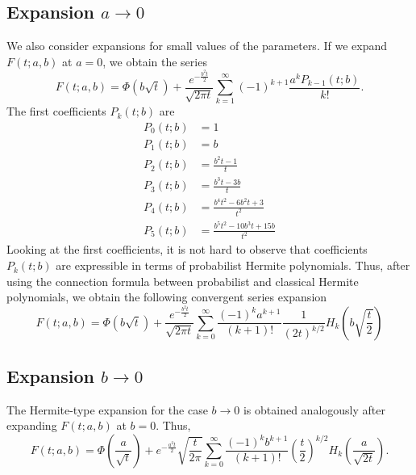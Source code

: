 \documentclass[10pt,a4paper,oneside]{article}
\numberwithin{equation}{section}
\begin{document}
\begin{appendices}
\subsection{Expansion $a \to 0$}
We also consider expansions for small values of the parameters. If we expand $F(t; a, b)$ at $a = 0$, we obtain the series
\begin{equation}
F(t; a, b) = \Phi\left(b\sqrt{t}\right) + \frac{e^{-\frac{b^2 t}{2}}}{\sqrt{2\pi t}}\sum_{k=1}^{\infty} (-1)^{k+1} \frac{a^k P_{k-1}(t; b)}{k!}.
\end{equation}
The first coefficients $P_k(t; b)$ are
\begin{align*}
P_0(t; b) &= 1\\
P_1(t; b) &= b\\
P_2(t; b) &= \frac{b^2 t - 1}{t}\\
P_3(t; b) &= \frac{b^3 t - 3b}{t}\\
P_4(t; b) &= \frac{b^4 t^2 - 6b^2t + 3}{t^2}\\
P_5(t; b) &= \frac{b^5 t^2 - 10b^3 t + 15 b}{t^2}
\end{align*}
Looking at the first coefficients, it is not hard to observe that coefficients $P_k(t;b)$ are expressible in terms of probabilist Hermite polynomials. Thus, after using the connection formula between probabilist and classical Hermite polynomials, we obtain the following convergent series expansion
\begin{equation}\label{phi_expansion_a_small}
F(t; a, b) = \Phi\left(b\sqrt{t}\right) + \frac{e^{-\frac{b^2 t}{2}}}{\sqrt{2\pi t}} \sum_{k=0}^{\infty} \frac{(-1)^k a^{k+1}}{(k+1)!}\frac{1}{(2t)^{k/2}} H_k\left( b\sqrt{\frac{t}{2}}\right)
\end{equation}

\subsection{Expansion $b \to 0$}
The Hermite-type expansion for the case $b \to 0$ is obtained analogously after expanding $F(t; a, b)$ at $b=0$. Thus,
\begin{equation}\label{phi_expansion_b_small}
F(t; a, b) = \Phi\left(\frac{a}{\sqrt{t}}\right) + e^{-\frac{a^2 t}{2}}\sqrt{\frac{t}{2\pi}} \sum_{k=0}^{\infty}\frac{(-1)^k b^{k+1}}{(k + 1)!}\left(\frac{t}{2}\right)^{k/2} H_k\left(\frac{a}{\sqrt{2t}}\right).
\end{equation}


\end{appendices}
\end{document}
